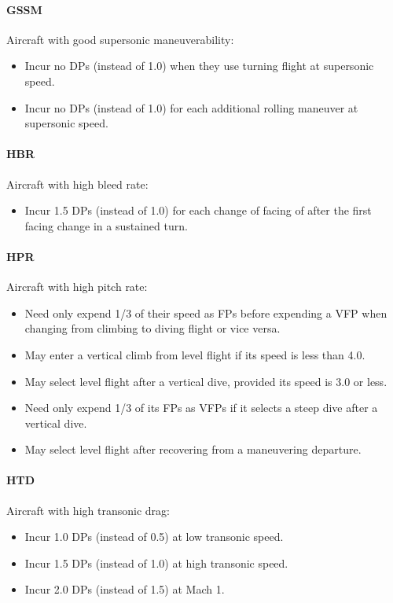 \documentclass[10pt]{article}
\begin{document}
\paragraph{GSSM} Aircraft with good supersonic maneuverability:
\begin{itemize}
    \item Incur no DPs (instead of 1.0) when they use turning flight at supersonic speed.
    \item Incur no DPs (instead of 1.0) for each additional rolling maneuver at supersonic speed.
\end{itemize}

\paragraph{HBR} Aircraft with high bleed rate:
\begin{itemize}
    \item Incur 1.5 DPs (instead of 1.0) for each change of facing of  after the first facing change in a sustained turn.
\end{itemize}

\paragraph{HPR} Aircraft with high pitch rate:
\begin{itemize}
    \item Need only expend 1/3 of their speed as FPs before expending a VFP when changing from climbing to diving flight or vice versa.
    \item May enter a vertical climb from level flight if its speed is less than 4.0.
    \item May select level flight after a vertical dive, provided its speed is 3.0 or less.
    \item Need only expend 1/3 of its FPs as VFPs if it selects a steep dive after a vertical dive.
    \item May select level flight after recovering from a maneuvering departure.
\end{itemize}

\paragraph{HTD} Aircraft with high transonic drag:
\begin{itemize}
    \item Incur 1.0 DPs (instead of 0.5) at low transonic speed.
    \item Incur 1.5 DPs (instead of 1.0) at high transonic speed.
    \item Incur 2.0 DPs (instead of 1.5) at Mach 1.
\end{itemize}
\end{document}

